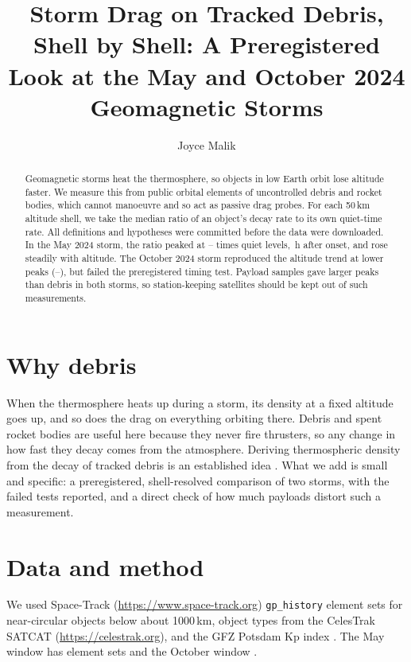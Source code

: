 \documentclass[linenumbers]{aastex701}
\begin{document}
\title{Storm Drag on Tracked Debris, Shell by Shell: A Preregistered Look at the May and October 2024 Geomagnetic Storms}

\author[0009-0001-8293-8064]{Joyce Malik}

\begin{abstract}
Geomagnetic storms heat the thermosphere, so objects in low Earth orbit lose altitude faster. We measure this from public orbital elements of uncontrolled debris and rocket bodies, which cannot manoeuvre and so act as passive drag probes. For each 50\,km altitude shell, we take the median ratio of an object's decay rate to its own quiet-time rate. All definitions and hypotheses were committed before the data were downloaded. In the May 2024 storm, the ratio peaked at \MayPeakMin--\MayPeakMax{} times quiet levels, \MayLagFour\,h after onset, and rose steadily with altitude. The October 2024 storm reproduced the altitude trend at lower peaks (\OctPeakMin--\OctPeakMax), but failed the preregistered timing test. Payload samples gave larger peaks than debris in both storms, so station-keeping satellites should be kept out of such measurements.
\end{abstract}

\section{Why debris}
When the thermosphere heats up during a storm, its density at a fixed altitude goes up, and so does the drag on everything orbiting there. Debris and spent rocket bodies are useful here because they never fire thrusters, so any change in how fast they decay comes from the atmosphere. Deriving thermospheric density from the decay of tracked debris is an established idea \citep{Johlander2026,Constant2024}. What we add is small and specific: a preregistered, shell-resolved comparison of two storms, with the failed tests reported, and a direct check of how much payloads distort such a measurement.

\section{Data and method}
We used Space-Track (\url{https://www.space-track.org}) \texttt{gp\_history} element sets for near-circular objects below about 1000\,km, object types from the CelesTrak SATCAT (\url{https://celestrak.org}), and the GFZ Potsdam Kp index \citep{Matzka2021,Matzka2021data}. The May window has \MayNSets{} element sets and the October window \OctNSets.
\end{document}
